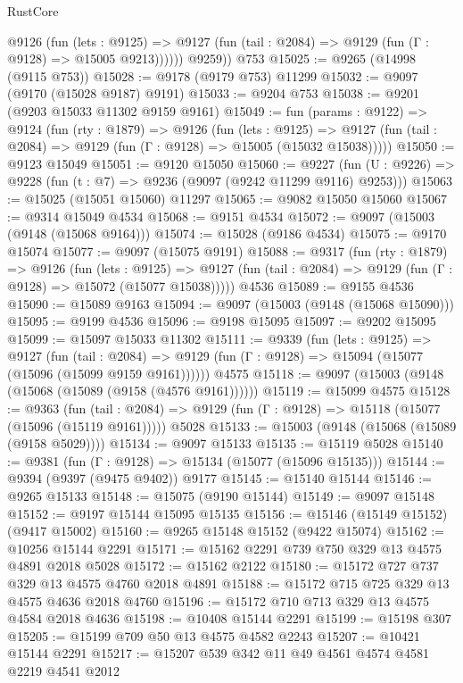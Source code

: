 \begin{lexlean}{RustCore}
\begin{coremodule}
            @9126
              (fun (lets : @9125) =>
              @9127 (fun (tail : @2084) => @9129 (fun (Γ : @9128) => @15005 @9213))))))
        @9259))
    @753
@15025 := @9265 (@14998 (@9115 @753))
@15028 := @9178 (@9179 @753) @11299
@15032 := @9097 (@9170 (@15028 @9187) @9191)
@15033 := @9204 @753
@15038 := @9201 (@9203 @15033 @11302 @9159 @9161)
@15049 := fun (params : @9122) =>
  @9124
    (fun (rty : @1879) =>
    @9126
      (fun (lets : @9125) =>
      @9127 (fun (tail : @2084) => @9129 (fun (Γ : @9128) => @15005 (@15032 @15038)))))
@15050 := @9123 @15049
@15051 := @9120 @15050
@15060 := @9227
    (fun (U : @9226) => @9228 (fun (t : @7) => @9236 (@9097 (@9242 @11299 @9116) @9253)))
@15063 := @15025 (@15051 @15060) @11297
@15065 := @9082 @15050 @15060
@15067 := @9314 @15049 @4534
@15068 := @9151 @4534
@15072 := @9097 (@15003 (@9148 (@15068 @9164)))
@15074 := @15028 (@9186 @4534)
@15075 := @9170 @15074
@15077 := @9097 (@15075 @9191)
@15088 := @9317
    (fun (rty : @1879) =>
    @9126
      (fun (lets : @9125) =>
      @9127 (fun (tail : @2084) => @9129 (fun (Γ : @9128) => @15072 (@15077 @15038)))))
    @4536
@15089 := @9155 @4536
@15090 := @15089 @9163
@15094 := @9097 (@15003 (@9148 (@15068 @15090)))
@15095 := @9199 @4536
@15096 := @9198 @15095
@15097 := @9202 @15095
@15099 := @15097 @15033 @11302
@15111 := @9339
    (fun (lets : @9125) =>
    @9127
      (fun (tail : @2084) =>
      @9129 (fun (Γ : @9128) => @15094 (@15077 (@15096 (@15099 @9159 @9161))))))
    @4575
@15118 := @9097 (@15003 (@9148 (@15068 (@15089 (@9158 (@4576 @9161))))))
@15119 := @15099 @4575
@15128 := @9363
    (fun (tail : @2084) => @9129 (fun (Γ : @9128) => @15118 (@15077 (@15096 (@15119 @9161)))))
    @5028
@15133 := @15003 (@9148 (@15068 (@15089 (@9158 @5029))))
@15134 := @9097 @15133
@15135 := @15119 @5028
@15140 := @9381 (fun (Γ : @9128) => @15134 (@15077 (@15096 @15135)))
@15144 := @9394 (@9397 (@9475 @9402)) @9177
@15145 := @15140 @15144
@15146 := @9265 @15133
@15148 := @15075 (@9190 @15144)
@15149 := @9097 @15148
@15152 := @9197 @15144 @15095 @15135
@15156 := @15146 (@15149 @15152) (@9417 @15002)
@15160 := @9265 @15148 @15152 (@9422 @15074)
@15162 := @10256 @15144 @2291
@15171 := @15162 @2291 @739 @750 @329 @13 @4575 @4891 @2018 @5028
@15172 := @15162 @2122
@15180 := @15172 @727 @737 @329 @13 @4575 @4760 @2018 @4891
@15188 := @15172 @715 @725 @329 @13 @4575 @4636 @2018 @4760
@15196 := @15172 @710 @713 @329 @13 @4575 @4584 @2018 @4636
@15198 := @10408 @15144 @2291
@15199 := @15198 @307
@15205 := @15199 @709 @50 @13 @4575 @4582 @2243
@15207 := @10421 @15144 @2291
@15217 := @15207 @539 @342 @11 @49 @4561 @4574 @4581 @2219 @4541 @2012

\end{coremodule}
\end{lexlean}
